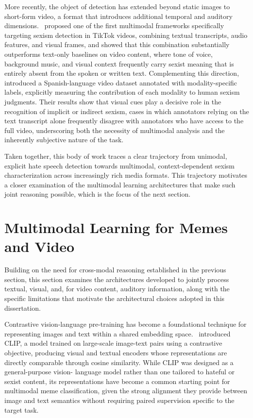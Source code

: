 More recently, the object of detection has extended beyond static images to short-form
video, a format that introduces additional temporal and auditory dimensions.~\cite{arcos2024tiktok}
proposed one of the first multimodal frameworks specifically targeting sexism detection
in TikTok videos, combining textual transcripts, audio features, and visual frames, and
showed that this combination substantially outperforms text-only baselines on video
content, where tone of voice, background music, and visual context frequently carry
sexist meaning that is entirely absent from the spoken or written text. Complementing this
direction,~\cite{degrazia2025mused} introduced a Spanish-language video dataset annotated
with modality-specific labels, explicitly measuring the contribution of each modality to
human sexism judgments. Their results show that visual cues play a decisive role in the
recognition of implicit or indirect sexism, cases in which annotators relying on the text
transcript alone frequently disagree with annotators who have access to the full video, underscoring
both the necessity of multimodal analysis and the inherently subjective nature
of the task.

Taken together, this body of work traces a clear trajectory from unimodal, explicit hate
speech detection towards multimodal, context-dependent sexism characterization across
increasingly rich media formats. This trajectory motivates a closer examination of the
multimodal learning architectures that make such joint reasoning possible, which is the
focus of the next section.

\section{Multimodal Learning for Memes and Video}\label{sec:multimodal-learning-memes-video}

Building on the need for cross-modal reasoning established in the previous section, this
section examines the architectures developed to jointly process textual, visual, and, for
video content, auditory information, along with the specific limitations that motivate the
architectural choices adopted in this dissertation.

Contrastive vision-language pre-training has become a foundational technique for
representing images and text within a shared embedding space.~\cite{radford2021learning}
introduced CLIP, a model trained on large-scale image-text pairs using a contrastive
objective, producing visual and textual encoders whose representations are directly comparable through cosine similarity. While CLIP was designed as a general-purpose vision-
language model rather than one tailored to hateful or sexist content, its representations
have become a common starting point for multimodal meme classification, given the
strong alignment they provide between image and text semantics without requiring paired
supervision specific to the target task.

